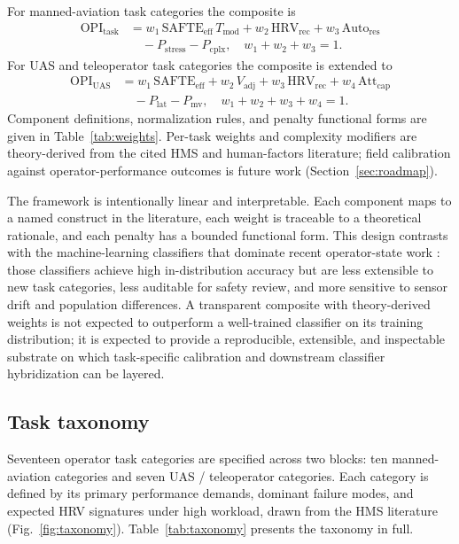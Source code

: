 \documentclass[10pt,journal,twocolumn,compsoc]{IEEEtran}
\begin{document}
For manned-aviation task categories the composite is
\begin{equation}
\begin{aligned}
\mathrm{OPI}_{\mathrm{task}} &= w_1\,\mathrm{SAFTE_{eff}}\,T_{\mathrm{mod}} + w_2\,\mathrm{HRV_{rec}} + w_3\,\mathrm{Auto_{res}} \\
&\quad - P_{\mathrm{stress}} - P_{\mathrm{cplx}}, \quad w_1{+}w_2{+}w_3 = 1.
\end{aligned}
\label{eq:opi-manned}
\end{equation}
For UAS and teleoperator task categories the composite is extended to
\begin{equation}
\begin{aligned}
\mathrm{OPI}_{\mathrm{UAS}} &= w_1\,\mathrm{SAFTE_{eff}} + w_2\,V_{\mathrm{adj}} + w_3\,\mathrm{HRV_{rec}} + w_4\,\mathrm{Att_{cap}} \\
&\quad - P_{\mathrm{lat}} - P_{\mathrm{mv}}, \quad w_1{+}w_2{+}w_3{+}w_4 = 1.
\end{aligned}
\label{eq:opi-uas}
\end{equation}
Component definitions, normalization rules, and penalty functional forms are given in Table~\ref{tab:weights}. Per-task weights and complexity modifiers are theory-derived from the cited HMS and human-factors literature; field calibration against operator-performance outcomes is future work (Section~\ref{sec:roadmap}).

The framework is intentionally linear and interpretable. Each component maps to a named construct in the literature, each weight is traceable to a theoretical rationale, and each penalty has a bounded functional form. This design contrasts with the machine-learning classifiers that dominate recent operator-state work \cite{stevens2022,vogl2025,jin2025}: those classifiers achieve high in-distribution accuracy but are less extensible to new task categories, less auditable for safety review, and more sensitive to sensor drift and population differences. A transparent composite with theory-derived weights is not expected to outperform a well-trained classifier on its training distribution; it is expected to provide a reproducible, extensible, and inspectable substrate on which task-specific calibration and downstream classifier hybridization can be layered.

\subsection{Task taxonomy}
Seventeen operator task categories are specified across two blocks: ten manned-aviation categories and seven UAS / teleoperator categories. Each category is defined by its primary performance demands, dominant failure modes, and expected HRV signatures under high workload, drawn from the HMS literature (Fig.~\ref{fig:taxonomy}). Table~\ref{tab:taxonomy} presents the taxonomy in full.
\end{document}
